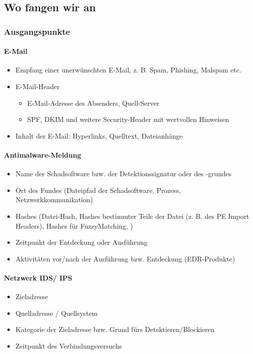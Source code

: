 \subsection{Wo fangen wir an}
\subsubsection{Ausgangspunkte}

\paragraph{E-Mail}
\begin{itemize}
    \item Empfang einer unerwünschten E-Mail, z. B. Spam, Phishing, Malspam etc.
    \item E-Mail-Header
    \begin{itemize}
        \item E-Mail-Adresse des Absenders, Quell-Server
        \item SPF, DKIM und weitere Security-Header mit wertvollen Hinweisen
    \end{itemize}
    \item Inhalt der E-Mail: Hyperlinks, Quelltext, Dateianhänge
\end{itemize}

\paragraph{Antimalware-Meldung}

\begin{itemize}
    \item Name der Schadsoftware bzw. der Detektionssignatur oder des -grundes
    \item Ort des Fundes (Dateipfad der Schadsoftware, Prozess, Netzwerkkommunikation)
    \item Hashes (Datei-Hash, Hashes bestimmter Teile der Datei (z. B. des PE Import Headers), Hashes für FuzzyMatching, )
    \item Zeitpunkt der Entdeckung oder Ausführung
    \item Aktivitäten vor/nach der Ausführung bzw. Entdeckung (EDR-Produkte)
\end{itemize}

\paragraph{Netzwerk IDS/ IPS}
\begin{itemize}
    \item Zieladresse
    \item Quelladresse / Quellsystem
    \item Kategorie der Zieladresse bzw. Grund fürs Detektieren/Blockieren
    \item Zeitpunkt des Verbindungsversuchs
\end{itemize}

